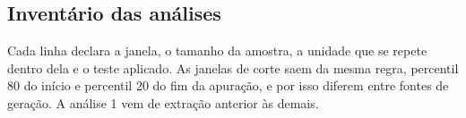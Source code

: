 \clearpage
\begin{landscape}

\chapter{Inventário das análises}
\label{ap:inventario}

\begin{promancha}
Cada linha declara a janela, o tamanho da amostra, a unidade que se repete
dentro dela e o teste aplicado. As janelas de corte saem da mesma regra,
percentil 80 do início e percentil 20 do fim da apuração, e por isso diferem
entre fontes de geração. A análise 1 vem de extração anterior às demais.
\end{promancha}


\end{landscape}
